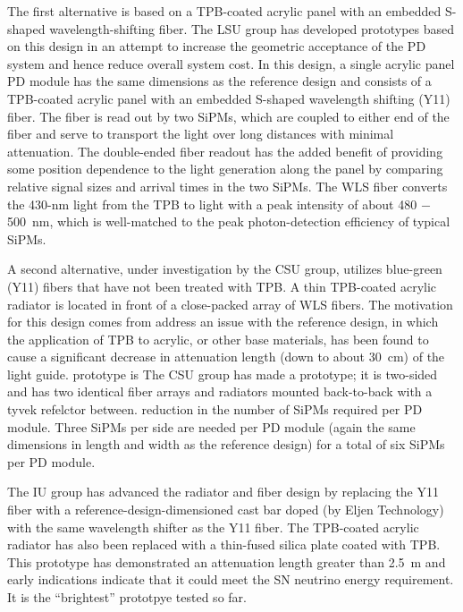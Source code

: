 The first alternative is based on a TPB-coated acrylic
panel with an embedded S-shaped wavelength-shifting fiber. The LSU
group has developed prototypes based on this design in an attempt to
increase the geometric acceptance of the PD system and hence reduce
overall system cost. 
%
In this design, a single acrylic panel PD module has the same
dimensions as the reference design and consists of a TPB-coated
acrylic panel with an embedded S-shaped wavelength shifting (Y11)
fiber. The fiber is read out by two SiPMs, which are coupled to either
end of the fiber and serve to transport the light over long distances
with minimal attenuation. The double-ended fiber readout has the added
benefit of providing some position dependence to the light generation
along the panel by comparing relative signal sizes and arrival times
in the two SiPMs. The WLS fiber converts the 430-nm light from the TPB
to light with a peak intensity of about 480 $-$ 500~nm, which is
well-matched to the peak photon-detection efficiency of typical SiPMs.

A second alternative, under investigation by the CSU group, utilizes
blue-green (Y11) fibers that have not been treated with TPB. A thin
TPB-coated acrylic radiator is located in front of a close-packed
array of WLS fibers. The motivation for this design comes from %
address an issue with the reference design, in which the application
of TPB to acrylic, or other base materials, has been found to cause a
significant decrease in attenuation length (down to about 30~cm) of
the light guide.  %
prototype is The CSU group has made a prototype; it is two-sided and
has two identical fiber arrays and radiators mounted back-to-back with
a tyvek refelctor between. %
reduction in the number of SiPMs required per PD module. Three SiPMs
per side are needed per PD module (again the same dimensions in length
and width as the reference design) for a total of six SiPMs per PD
module.

The IU group has advanced the radiator and fiber design  by replacing
the Y11 fiber with a reference-design-dimensioned cast bar doped (by
Eljen Technology) with the same wavelength shifter as the Y11
fiber. The TPB-coated acrylic radiator has also been replaced with a
thin-fused silica plate coated with TPB. This prototype has
demonstrated an attenuation length greater than 2.5~m and early
indications %
indicate that it could meet the SN neutrino energy
requirement. It is the ``brightest'' prototpye tested so far.

